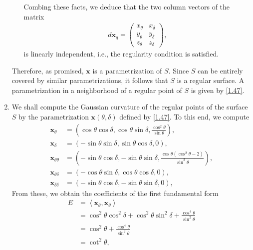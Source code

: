 \documentclass[a4paper]{article}
\numberwithin{equation}{section}
\begin{document}
\begin{enumerate}
\begin{enumerate}
Combing these facts, we deduce that the two column vectors of the matrix 
\begin{align}
d{\mathbf{x}_q} = \left( {\begin{array}{*{20}{c}}
{{x_\theta }}&{{x_\delta }}\\
{{y_\theta }}&{{y_\delta }}\\
{{z_\theta }}&{{z_\delta }}
\end{array}} \right),
\end{align}
is linearly independent, i.e., the regularity condition is satisfied. 
\end{enumerate}
Therefore, as promised, $\mathbf{x}$ is a parametrization of $S$. Since $S$ can be entirely covered by similar parametrizations, it follows that $S$ is a regular surface. A parametrization in a neighborhood of a regular point of $S$ is given by \eqref{1.47}.
\item We shall compute the Gaussian curvature of the regular points of the surface $S$ by the parametrization $\mathbf{x}\left(\theta, \delta \right)$ defined by \eqref{1.47}. To this end, we compute
\begin{align}
{\mathbf{x}_\theta } &= \left( {\cos \theta \cos \delta ,\cos \theta \sin \delta ,\frac{{{{\cos }^2}\theta }}{{\sin \theta }}} \right),\\
{\mathbf{x}_\delta } &= \left( { - \sin \theta \sin \delta ,\sin \theta \cos \delta ,0} \right),\\
{\mathbf{x}_{\theta \theta }} &= \left( { - \sin \theta \cos \delta , - \sin \theta \sin \delta ,\frac{{\cos \theta \left( {{{\cos }^2}\theta  - 2} \right)}}{{{{\sin }^2}\theta }}} \right),\\
{\mathbf{x}_{\theta \delta }} &= \left( { - \cos \theta \sin \delta ,\cos \theta \cos \delta ,0} \right),\\
{\mathbf{x}_{\delta \delta }} &= \left( { - \sin \theta \cos \delta , - \sin \theta \sin \delta ,0} \right),
\end{align}
From these, we obtain the coefficients of the first fundamental form 
\begin{align}
E &= \left\langle {{\mathbf{x}_\theta },{\mathbf{x}_\theta }} \right\rangle \\
 &= {\cos ^2}\theta {\cos ^2}\delta  + {\cos ^2}\theta {\sin ^2}\delta  + \frac{{{{\cos }^4}\theta }}{{{{\sin }^2}\theta }}\\
& = {\cos ^2}\theta  + \frac{{{{\cos }^4}\theta }}{{{{\sin }^2}\theta }}\\
& = {\cot ^2}\theta ,\\

\end{align}
\end{enumerate}
\end{document}
